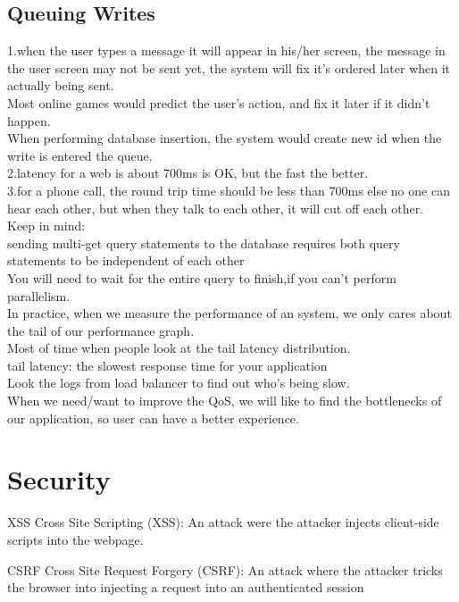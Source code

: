 \documentclass[fancy,11pt,titlestyle=display]{style/elegantbook}
\begin{document}
\section{Queuing Writes}
1.when the user types a message it will appear in his/her screen, the message in the user screen may not be sent yet, the system will fix it's ordered later when it actually being sent.\\
Most online games would predict the user's action, and fix it later if it didn't happen.\\
When performing database insertion, the system would create new id when the write is entered the queue.\\
2.latency for a web is about 700ms is OK, but the fast the better.\\
3.for a phone call, the round trip time should be less than 700ms else no one can hear each other, but when they talk to each other, it will cut off each other.\\
Keep in mind:\\
sending multi-get query statements to the database requires both query statements to be independent of each other\\
You will need to wait for the entire query to finish,if you can't perform parallelism.\\
In practice, when we measure the performance of an system, we only cares about the tail of our performance graph.\\
Most of time when people look at the tail latency distribution.\\

tail latency: the slowest response time for your application \\
Look the logs from load balancer to find out who's being slow.\\

When we need/want to improve the QoS, we will like to find the bottlenecks of our application, so user can have a better experience.\\


\chapter{Security}

\begin{definition}{XSS}{}
Cross Site Scripting (XSS): An attack were the attacker injects client-side scripts into the webpage.
\end{definition}

\begin{definition}{CSRF}{}
Cross Site Request Forgery (CSRF): An attack where the attacker tricks the browser into injecting a request into an authenticated session
\end{definition}
\end{document}

